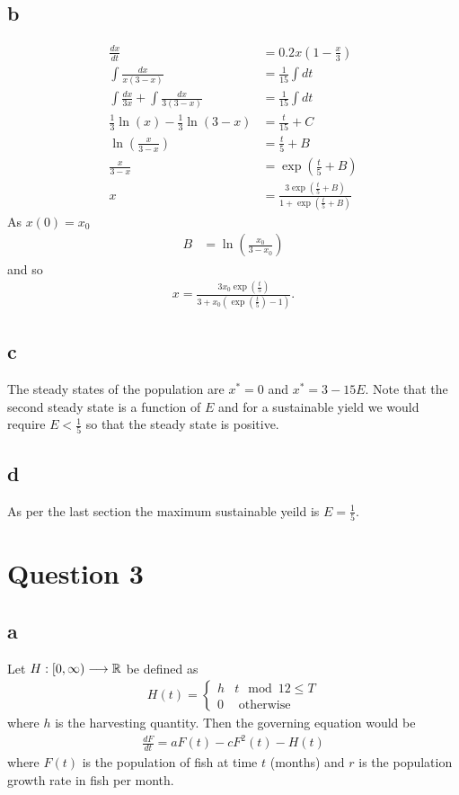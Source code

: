 \documentclass{unswmaths}
\begin{document}
\subsection*{b}
	\begin{align*}
		\frac{dx}{dt} &= 0.2x\left( 1 - \frac{x}{3} \right) \\
		\int \frac{dx}{x(3-x)} &= \frac{1}{15} \int dt \\
		\int \frac{dx}{3x} + \int \frac{dx}{3(3-x)} &= \frac{1}{15} \int dt \\
		\frac{1}{3} \ln(x) - \frac{1}{3} \ln(3-x) &= \frac{t}{15} + C \\
		\ln \left( \frac{x}{3-x} \right) &= \frac{t}{5} + B \\
		\frac{x}{3-x} &= \exp(\frac{t}{5} + B) \\
		x &= \frac{3\exp(\frac{t}{5} + B)}{1 + \exp(\frac{t}{5} + B)}
	\end{align*}
	As $ x(0) = x_0 $
	\begin{align*}
		B &= \ln \left( \frac{x_0}{3-x_0} \right)
	\end{align*}
	and so
	\begin{align*}
		x = \frac{3 x_0 \exp(\frac{t}{5})}{3 + x_0 (\exp(\frac{t}{5}) - 1)}.
	\end{align*}
\subsection*{c}
	The steady states of the population are
	$ x^* = 0 $ and $ x^* = 3 - 15E $. Note that the second steady state is a function of $ E $ and for a sustainable yield we would require $ E < \frac{1}{5} $ so that the steady state is positive.
	
\subsection*{d}
	As per the last section the maximum sustainable yeild is $ E = \frac{1}{5} $.

\section*{Question 3}
\subsection*{a}
Let $ H : [0, \infty) \longrightarrow \mathbb{R} $ be defined as
\begin{align*}
    H(t) = 
    \begin{cases}
        h & t \mod 12 \leq T \\
        0 & \text{ otherwise }
    \end{cases}
\end{align*}
where $ h $ is the harvesting quantity. 
Then the governing equation would be
\begin{align*}
    \frac{dF}{dt} = aF(t) - cF^2(t) - H(t)
\end{align*}
where $ F(t) $ is the population of fish at time $ t $ (months) and $ r $ is the population growth rate in fish per month.
\end{document}
